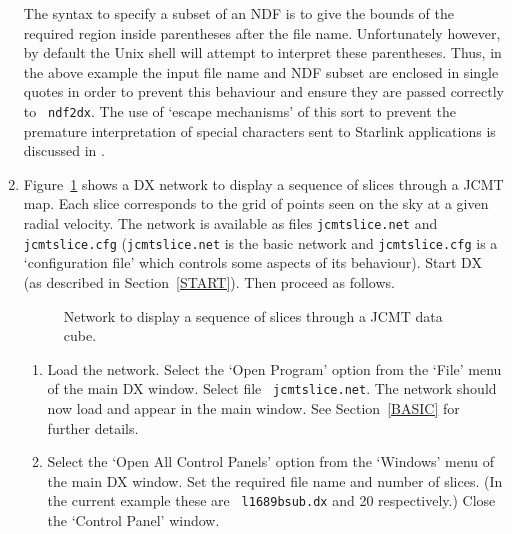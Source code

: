 \begin{enumerate}
   The syntax to specify a subset of an NDF is to give the bounds of
   the required region inside parentheses after the file name.  
   Unfortunately however, by default the Unix shell will attempt to
   interpret these parentheses.  Thus, in the above example the input
   file name and NDF subset are enclosed in single quotes in order to
   prevent this behaviour and ensure they are passed correctly to {\tt
   ndf2dx}.  The use of `escape mechanisms'  of this sort to prevent the
   premature interpretation of special characters sent to Starlink
   applications is discussed in \cite{SC4}.

  \item Figure~\ref{JCMTSLICE} shows a DX network to display a sequence
   of slices through a JCMT map.  Each slice corresponds to the grid
   of points seen on the sky at a given radial velocity.  The network
   is available as files {\tt jcmtslice.net} and {\tt jcmtslice.cfg}
   ({\tt jcmtslice.net} is the basic network and {\tt jcmtslice.cfg} is
   a `configuration file' which controls some aspects of its behaviour).
   Start DX (as described in Section~\ref{START}).  Then proceed as
   follows.

  \begin{figure}[htbp]

  \begin{center}
  \leavevmode
  \epsfxsize=450pt
  \end{center}

  \caption[Network to display a sequence of slices through a JCMT
   data cube.]{Network to display a sequence of slices through a JCMT
   data cube. \label{JCMTSLICE} }

  \end{figure}

  \begin{enumerate}

    \item Load the network.  Select the `Open Program' option from the
     `File' menu of the main DX window.  Select file {\tt
     jcmtslice.net}.  The network should now load and appear in the
     main window.  See Section~\ref{BASIC} for further details.

    \item Select the `Open All Control Panels' option from the `Windows'
     menu of the main DX window.  Set the required file name and
     number of slices.  (In the current example these are {\tt
     l1689bsub.dx} and 20 respectively.)  Close the `Control Panel'
     window.


\end{enumerate}
\end{enumerate}
